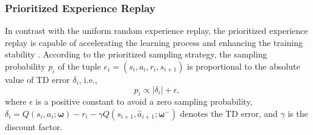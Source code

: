 \documentclass[lettersize,journal]{IEEEtran}
\begin{document}
\subsubsection{Prioritized Experience Replay}
In contrast with the uniform random experience replay, the prioritized experience replay is capable of accelerating the learning process and enhancing the training stability \cite{schaul2015prioritized}. According to the prioritized sampling strategy, the sampling probability $p_i$ of the tuple ${e_i = (s_i , a_i , r_i , s_{i+1})}$ is proportional to the absolute value of TD error $\delta_i$, i.e., %
\begin{equation}\label{eqn:prob_def}
    p_i  \propto |\delta_i| + \epsilon,
\end{equation}
where $ \epsilon$ is a positive constant to avoid a zero sampling probability, ${\delta _i} = Q({s_i},{a_i};{\boldsymbol{\omega }}) - {r_i} - \gamma Q({s_{i + 1}},{{\hat a}_{i + 1}};{{\boldsymbol{\omega }}^ - })$ denotes the TD error, and $\gamma$ is the discount factor.

\end{document}
